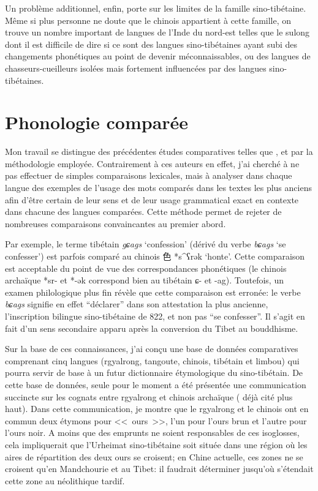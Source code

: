 \documentclass[oldfontcommands,oneside,a4paper,11pt]{memoir}
\newcommand{\zh}[1]{{\cn #1}}
\begin{document}
Un problème additionnel, enfin, porte sur les limites de la famille sino-tibétaine. Même si plus personne ne doute que le chinois appartient à cette famille, on trouve un nombre important de langues de l'Inde du nord-est telles que le sulong dont il est difficile de dire si ce sont des langues sino-tibétaines ayant subi des changements phonétiques au point de devenir méconnaissables, ou des langues de chasseurs-cueilleurs isolées mais fortement influencées par des langues sino-tibétaines. 


\section{Phonologie comparée}
Mon travail se distingue des précédentes études comparatives telles que \citet{peiros96st}, \citet{gong95st} et \citet{matisoff03} par la méthodologie employée. Contrairement à ces auteurs en effet, j’ai cherché à ne pas  effectuer de simples comparaisons lexicales, mais à analyser dans chaque langue des exemples de l'usage des mots comparés dans les textes les plus anciens afin d’être certain de leur sens et de leur usage grammatical exact en contexte dans chacune des langues comparées. Cette méthode permet de rejeter de nombreuses comparaisons convaincantes au premier abord. 


Par exemple, le terme tibétain \textit{gɕags} ‘confession’ (dérivé du verbe \textit{bɕags} ‘se confesser’) est parfois comparé au chinois \zh{色} *s^{ʕ}rək ‘honte’. Cette comparaison est acceptable du point de vue des correspondances phonétiques (le chinois archaïque *sr- et *-ək correspond bien au tibétain ɕ- et -ag). Toutefois, un examen philologique plus fin révèle que cette comparaison est erronée: le verbe  \textit{bɕags} signifie en effet ``déclarer'' dans son attestation la plus ancienne, l’inscription bilingue sino-tibétaine de 822, et non pas ``se confesser''. Il s’agit en fait d’un sens secondaire apparu après la conversion du Tibet au bouddhisme.


Sur la base de ces connaissances, j’ai conçu une base de données comparatives comprenant cinq langues (rgyalrong, tangoute, chinois, tibétain et limbou) qui pourra servir de base à un futur dictionnaire étymologique du sino-tibétain. De cette base de données, seule pour le moment a été présentée une communication succincte sur les cognats entre rgyalrong et chinois archaïque (\citealt{jacques05} déjà cité plus haut). Dans cette communication, je montre que le rgyalrong et le chinois ont en commun deux étymons pour <<~ours~>>, l'un pour l'ours brun et l'autre pour l'ours noir. A moins que des emprunts ne soient responsables de ces isoglosses, cela impliquerait que l'Urheimat sino-tibétaine soit située dans une région où les aires de répartition des deux ours se croisent; en Chine actuelle, ces zones ne se croisent qu'en Mandchourie et au Tibet: il faudrait déterminer jusqu'où s'étendait cette zone au néolithique tardif.
\end{document}
